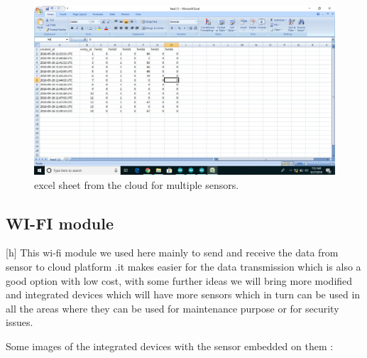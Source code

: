 \clearpage
\begin{figure}[h]
\centerline{\includegraphics[width=4.7in]{exformultiple}}
\caption{excel sheet from the cloud for multiple sensors.}
\end{figure}


\subsection{WI-FI module }[h]
This wi-fi module we used here mainly to send and receive the data from sensor  to cloud platform .it makes easier for the data transmission which is also a good option with low cost, with some further ideas we will bring more modified and integrated devices which will have more sensors which in turn can be used in all the areas where they can be used for maintenance purpose or for security issues.


Some images of the integrated devices with the sensor embedded on them :

